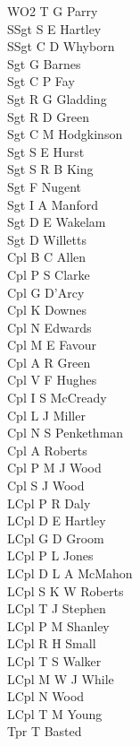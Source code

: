 \begin{multicols}{2}
  \noindent
  WO2 T G Parry \\
  SSgt S E Hartley \\
  SSgt C D Whyborn \\
  Sgt G Barnes \\
  Sgt C P Fay \\
  Sgt R G Gladding \\
  Sgt R D Green \\
  Sgt C M Hodgkinson \\
  Sgt S E Hurst \\
  Sgt S R B King \\
  Sgt F Nugent \\
  Sgt I A Manford \\
  Sgt D E Wakelam \\
  Sgt D Willetts \\
  Cpl B C Allen \\
  Cpl P S Clarke \\
  Cpl G D'Arcy \\
  Cpl K Downes \\
  Cpl N Edwards \\
  Cpl M E Favour \\
  Cpl A R Green \\
  Cpl V F Hughes \\
  Cpl I S McCready \\
  Cpl L J Miller \\
  Cpl N S Penkethman \\
  Cpl A Roberts \\
  Cpl P M J Wood \\
  Cpl S J Wood \\
  LCpl P R Daly \\
  LCpl D E Hartley \\
  LCpl G D Groom \\
  LCpl P L Jones \\
  LCpl D L A McMahon \\
  LCpl S K W Roberts \\
  LCpl T J Stephen \\
  LCpl P M Shanley \\
  LCpl R H Small \\
  LCpl T S Walker \\
  LCpl M W J While \\
  LCpl N Wood \\
  LCpl T M Young \\
  Tpr T Basted \\

\end{multicols}
